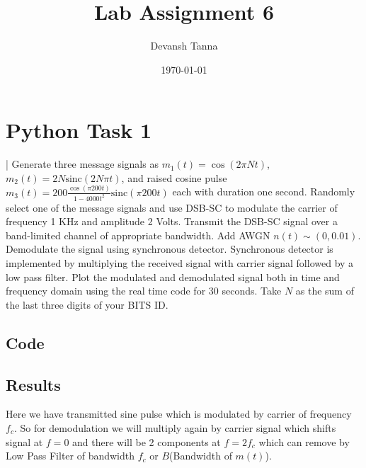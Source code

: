 \documentclass[
	12pt, 
]{fphw_assignment_toc}
\title{Lab Assignment 6}        %
\author{Devansh Tanna}    %
\date{\today}     %
\institute{Department of Electrical and Electronics}              %
\begin{document}
\maketitle
\newpage
{}    %
\tableofcontents
\newpage
{}          %


\section{Python Task 1}
\begin{problem}
 | Generate three message signals as $m_1(t) = \cos(2\pi Nt)$, $m_2(t) = 2N\text{sinc}(2N\pi t)$, and raised cosine pulse$m_3(t) = 200\frac{\cos(\pi 200 t)}{1-4000t^2}\text{sinc}(\pi 200 t)$ each with duration one second. Randomly select one of the message signals and use DSB-SC to modulate the carrier of frequency 1 KHz and amplitude 2 Volts. Transmit the DSB-SC signal over a band-limited channel of appropriate bandwidth. Add AWGN $n(t) \sim (0, 0.01)$. Demodulate the signal using synchronous detector. Synchronous detector is implemented by multiplying the received signal with carrier signal followed by a low pass filter. Plot the modulated and demodulated signal both in time and frequency domain using the real time code for 30 seconds. Take $N$ as the sum of the last three digits of your BITS ID.
\end{problem}

\subsection{Code}

\noindent
\lstset{style=pystyle}


\subsection{Results}
\noindent

Here we have transmitted sine pulse which is modulated by carrier of frequency $f_c$. So for demodulation we will multiply again by carrier signal which shifts signal at $f=0$ and there will be 2 components at $f=2f_c$ which can remove by Low Pass Filter of bandwidth $f_c$ or $B$(Bandwidth of $m(t)$). \\
\end{document}
